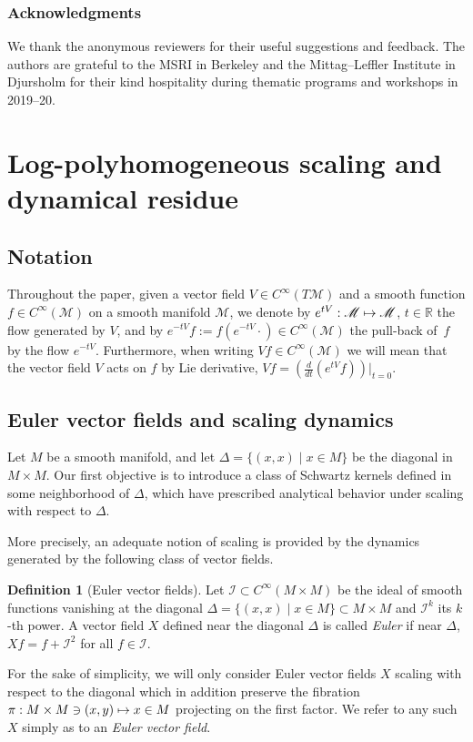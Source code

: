 \documentclass[10pt]{amsart}
\let\pazocal\mathscr
\def\mto{\mathchoice{\longmapsto}{\mapsto}{\mapsto}{\mapsto}}
\theoremstyle{definition}
\newtheorem{definition}[theorem]{Definition}
\let\st\mid
\let\euler X
\begin{document}
\subsubsection*{Acknowledgments}
We thank the anonymous reviewers for their useful suggestions and feedback. The authors are grateful to the MSRI in Berkeley and the Mittag--Leffler Institute in Djursholm for their kind hospitality during thematic programs and workshops in 2019--20.

\section{Log-polyhomogeneous scaling and dynamical residue}\label{section2}

\subsection{Notation}
Throughout the paper, given a vector field $V\in C^\infty(T\pazocal{M})$ and a smooth function $f\in C^\infty(\pazocal{M})$ on a smooth manifold $\pazocal{M}$, we denote by $e^{tV}:\pazocal{M}\mto \pazocal{M}$, $t\in \mathbb{R}$ the flow generated by $V$, and by $e^{-tV}f:=f(e^{-tV}\cdot)\in C^\infty(\pazocal{M})$ the pull-back of~$f$ by the flow $e^{-tV}$. Furthermore, when writing $Vf\in C^\infty(\pazocal{M})$ we will mean that the vector field $V$ acts on $f$ by {Lie derivative}, \ie $Vf=\left(\frac{d}{dt}\left(e^{tV}f\right)\right)|_{t=0}$.

\subsection{Euler vector fields and scaling dynamics}\label{ss:euler}

Let $M$ be a smooth manifold, and let $\Delta=\{(x,x) \st x\in M\}$ be the diagonal in $M\times M$. Our first objective is to introduce a class of
Schwartz kernels defined in some neighborhood of $\Delta$,
which have prescribed
analytical
behavior under scaling with respect to $\Delta$.

More precisely, an adequate notion of scaling is provided by the dynamics generated by the following class of vector fields.

\begin{definition}[Euler vector fields]
Let $\pazocal{I}\subset C^\infty(M\times M)$ be the ideal of smooth functions
vanishing at the diagonal $\Delta=\{(x,x) \st x\in M\}\subset M\times M$ and $\pazocal{I}^k$ its $k$-th power.
A vector field $\euler$ defined near the diagonal $\Delta$
is called \emph{Euler} if near $\Delta$, $\euler f=f+\pazocal{I}^2$ for all $f\in \pazocal{I}$.

For the sake of simplicity, we will only consider Euler vector fields $X$ scaling with respect to the diagonal which in addition preserve the fibration
$\pi: M\times M \ni (x,y)\mto x\in M$
projecting on the first factor. We refer to any such $\euler$ simply as to an \emph{Euler vector field}.
\end{definition}
\end{document}
